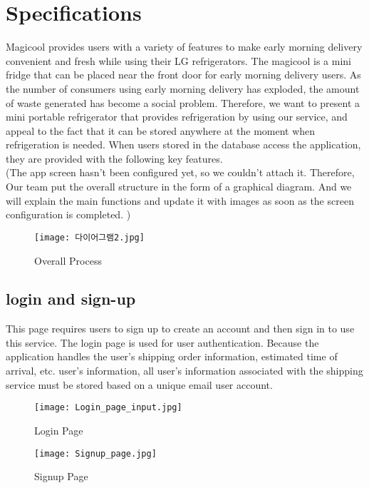\documentclass[conference]{IEEEtran}
\begin{document}
\section{Specifications}
Magicool provides users with a variety of features to make early morning delivery convenient and fresh while using their LG refrigerators. The magicool is a mini fridge that can be placed near the front door for early morning delivery users. As the number of consumers using early morning delivery has exploded, the amount of waste generated has become a social problem. Therefore, we want to present a mini portable refrigerator that provides refrigeration by using our service, and appeal to the fact that it can be stored anywhere at the moment when refrigeration is needed. 
When users stored in the database access the application, they are provided with the following key features. \\
(The app screen hasn't been configured yet, so we couldn't attach it. Therefore, Our team put the overall structure in the form of a graphical diagram. And we will explain the main functions and update it with images as soon as the screen configuration is completed. )
    \begin{figure}[h]
        \centerline{
            \texttt{[image: 다이어그램2.jpg]}}
    \label{fig}
    \caption{Overall Process}
        \end{figure}

\subsection{login and sign-up}
This page requires users to sign up to create an account and then sign in to use this service. The login page is used for user authentication. Because the application handles the user's shipping order information, estimated time of arrival, etc.
user's information, all user's information associated with the shipping service must be stored based on a unique email user account.

    \begin{figure}[h]
        \centerline{
            \texttt{[image: Login\_page\_input.jpg]}
        }
    \label{fig}
    \caption{Login Page}
    \end{figure}

    \begin{figure}[h]
    \centerline{
        \texttt{[image: Signup\_page.jpg]}
    }
    \label{fig}
    \caption{Signup Page}
    \end{figure}
\end{document}
